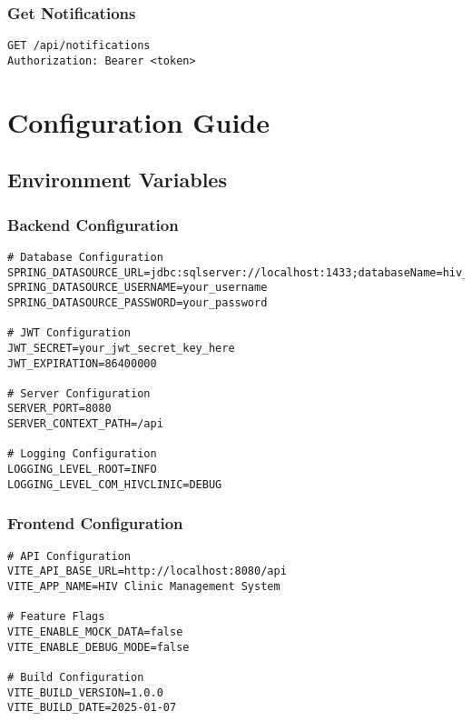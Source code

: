 \documentclass[12pt,a4paper]{article}
\begin{document}
\subsubsection{Get Notifications}

\begin{lstlisting}[language=HTTP, caption=Get Notifications Request]
GET /api/notifications
Authorization: Bearer <token>
\end{lstlisting}

\section{Configuration Guide}

\subsection{Environment Variables}

\subsubsection{Backend Configuration}

\begin{lstlisting}[language=properties, caption=Backend Environment Variables]
# Database Configuration
SPRING_DATASOURCE_URL=jdbc:sqlserver://localhost:1433;databaseName=hiv_clinic
SPRING_DATASOURCE_USERNAME=your_username
SPRING_DATASOURCE_PASSWORD=your_password

# JWT Configuration
JWT_SECRET=your_jwt_secret_key_here
JWT_EXPIRATION=86400000

# Server Configuration
SERVER_PORT=8080
SERVER_CONTEXT_PATH=/api

# Logging Configuration
LOGGING_LEVEL_ROOT=INFO
LOGGING_LEVEL_COM_HIVCLINIC=DEBUG
\end{lstlisting}

\subsubsection{Frontend Configuration}

\begin{lstlisting}[language=properties, caption=Frontend Environment Variables]
# API Configuration
VITE_API_BASE_URL=http://localhost:8080/api
VITE_APP_NAME=HIV Clinic Management System

# Feature Flags
VITE_ENABLE_MOCK_DATA=false
VITE_ENABLE_DEBUG_MODE=false

# Build Configuration
VITE_BUILD_VERSION=1.0.0
VITE_BUILD_DATE=2025-01-07
\end{lstlisting}
\end{document}
